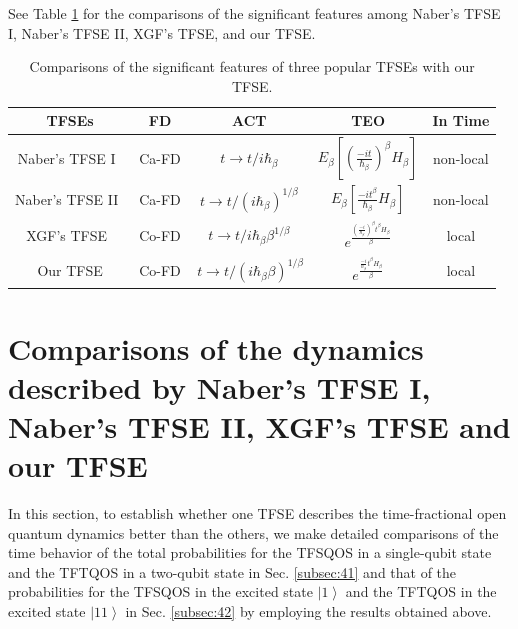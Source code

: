 \documentclass[
showpacs,  %
showkeys,  %
aps,       %
amsthm,    %
amsmath,   %
amsfonts,  %
amssymb    %
]{revtex4-1}          %
\begin{document}
See Table \ref{tab1} for the comparisons of the significant features among Naber's TFSE I, Naber's TFSE II, XGF's TFSE, and our TFSE.
\begin{table}
\caption{\label{tab1}
Comparisons of the significant features of three popular TFSEs with our TFSE.}
\begin{ruledtabular}
\begin{tabular}{ccccc}
TFSEs &FD &ACT  &TEO &In Time \\ \hline
Naber's TFSE I~\cite{Naber2004} &Ca-FD &$t\to t/i\hbar_\beta$ &${E_\beta}\left[{{{(\frac{{-it}}{\hbar_\beta})}^\beta }{H_\beta}}\right]$ &non-local  \\
Naber's TFSE II~\cite{Naber2004} &Ca-FD &$t\to t/{(i\hbar_\beta)^{1/\beta}}$ &${E_\beta}\left[{\frac{{- i{t^\beta}}}{{{\hbar_\beta}}}{H_\beta}}\right]$ &non-local \\
XGF's TFSE~\cite{Xiang2019} &Co-FD  &$t\to t/i\hbar_\beta {\beta^{1/\beta}}$  &${e^{\frac{{{{(\frac{{-i}}{{{\hbar_\beta}}})}^\beta }{t^\beta }{H_\beta }}}{\beta }}}$  &local \\
Our TFSE  &Co-FD  &$\,t \to t/{(i\hbar_\beta \beta)^{1/\beta}}$  &${e^{\frac{{\frac{{- i}}{{{\hbar_\beta }}}{t^\beta}{H_\beta}}}{\beta}}}$   &local \\
\end{tabular}
\end{ruledtabular}
\end{table}

\section{Comparisons of the dynamics described by Naber's TFSE I, Naber's TFSE II, XGF's TFSE and our TFSE}
\label{sec:4}
In this section, to establish whether one TFSE describes the time-fractional open quantum dynamics better than the others, we make detailed comparisons of the time behavior of the total probabilities for the TFSQOS in a single-qubit state and the TFTQOS in a two-qubit state in Sec. \ref{subsec:41} and that of the probabilities for the TFSQOS in the excited state $\left|{1}\right\rangle$ and the TFTQOS in the excited state $\left|{11}\right\rangle$ in Sec. \ref{subsec:42} by employing the results obtained above.
\end{document}
